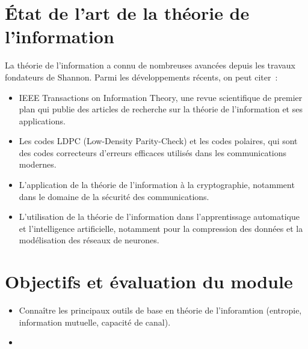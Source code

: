 \section{État de l'art de la théorie de l'information}
La théorie de l'information a connu de nombreuses avancées depuis les travaux fondateurs de Shannon. Parmi les développements récents, on peut citer~:
\begin{itemize}
    \item IEEE Transactions on Information Theory, une revue scientifique de premier plan qui publie des articles de recherche sur la théorie de l'information et ses applications.
    \item Les codes LDPC (Low-Density Parity-Check) et les codes polaires, qui sont des codes correcteurs d'erreurs efficaces utilisés dans les communications modernes.
    \item L'application de la théorie de l'information à la cryptographie, notamment dans le domaine de la sécurité des communications.
    \item L'utilisation de la théorie de l'information dans l'apprentissage automatique et l'intelligence artificielle, notamment pour la compression des données et la modélisation des réseaux de neurones.
\end{itemize}

\section{Objectifs et évaluation du module}

\begin{itemize}
    \item Connaître les principaux outils de base en théorie de l'inforamtion (entropie, information mutuelle, capacité de canal).
    \item 
\end{itemize}
